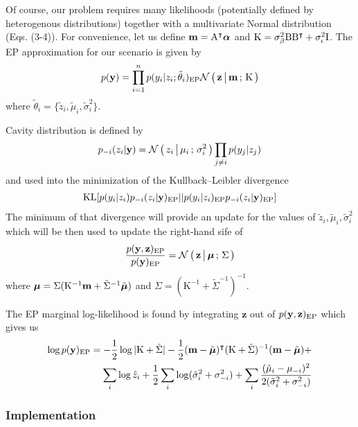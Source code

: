 Of course, our problem requires many likelihoods (potentially defined by
heterogenous distributions) together with a multivariate Normal distribution
(Eqs. (3-4)). For convenience, let us define $\mathbf m = \mathrm A^\intercal \boldsymbol\alpha$
and $\mathrm K = \sigma^2_{\beta} \mathrm B\mathrm B^\intercal + \sigma^2_{\epsilon}
\mathrm I$. The EP approximation for our scenario is given by
\begin{align*}
p(\mathbf y) = \prod_{i=1}^n p(y_i|z_i; \tilde \theta_i)_{\text{EP}} \mathcal{N}\left(\, { {\mathbf z} \, \big| \, {\mathbf m} } \,;\, { {\mathrm K} } \,\right)
\end{align*}
where $\tilde \theta_i = \{\tilde z_i, \tilde \mu_i, \tilde \sigma^2_i\}$.

Cavity distribution is defined by
\begin{align*}
p_{-i}(z_i|\mathbf y) = \mathcal{N}\left(\, { {z_i} \, \big| \, {\mu_i} } \,;\, { {\sigma^2_i} } \,\right) \prod_{j\neq i} p(y_j|z_j)
\end{align*}
and used into the minimization of the Kullback–Leibler divergence
\begin{align*}
\mathrm{KL}[ p(y_i|z_i) p_{-i}(z_i | \mathbf y)_{\text{EP}} || p(y_i|z_i)_{\text{EP}} p_{-i}(z_i | \mathbf y)_{\text{EP}}]
\end{align*}
The minimum of that divergence will provide an update for the values of $\tilde z_i, \tilde\mu_i, \tilde\sigma^2_i$ which will be then used to update the right-hand sife of
\begin{align*}
\frac{p(\mathbf y, \mathbf z)_{\text{EP}}}{p(\mathbf y)_{\text{EP}}} = \mathcal{N}\left(\, { {\mathbf z} \, \big| \, {\boldsymbol\mu} } \,;\, { {\Sigma} } \,\right)
\end{align*}
where $\boldsymbol\mu = \Sigma(\mathrm K^{-1} \mathbf m + \tilde\Sigma^{-1}\tilde{\boldsymbol\mu})$ and $\Sigma=(\mathrm K^{-1} + \tilde\Sigma^{-1})^{-1}$.

The EP marginal log-likelihood is found by integrating $\mathbf z$ out of $p(\mathbf y, \mathbf z)_{\text{EP}}$ which gives us
\begin{align*}
\log p(\mathbf y)_{\text{EP}} = -\frac{1}{2} \log |\mathrm K + \tilde \Sigma| - \frac{1}{2} (\mathbf m - \tilde{\boldsymbol\mu})^\intercal(\mathrm K + \tilde\Sigma)^{-1}(\mathbf m - \tilde{\boldsymbol\mu}) +\\
\sum_i \log \hat z_i + \frac{1}{2} \sum_i \log(\tilde \sigma_i^2 + \sigma_{-i}^2) + \sum_i \frac{(\tilde \mu_i - \mu_{-i})^2}{2(\tilde \sigma_i^2 + \sigma_{-i}^2)}
\end{align*}

\subsubsection{Implementation}


